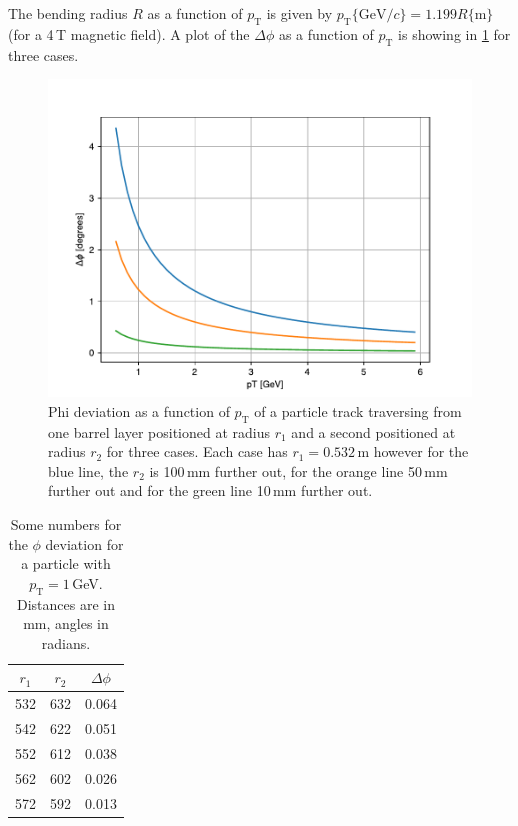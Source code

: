 \documentclass[a4paper, 12pt]{article}
\newcommand{\pt}{\ensuremath{p_{\mathrm{T}}}\xspace}
\begin{document}
The bending radius $R$ as a function of \pt is given by $\pt \{ \mathrm{GeV}/c \} = 1.199 R \{ \mathrm{m} \} $ (for a 4\,T magnetic field).
A plot of the $\Delta \phi$ as a function of \pt is showing in \cref{fig:phiDeviation} for three cases.
\begin{figure}
  \centering
  \includegraphics[width=0.7\linewidth]{images/phiDeviation.pdf}
  \caption{Phi deviation as a function of \pt of a particle track traversing from one barrel layer positioned at radius $r_1$ and a second positioned at radius $r_2$ for three cases. 
  Each case has $r_1 = 0.532$\,m however for the blue line, the $r_2$ is 100\,mm further out, for the orange line 50\,mm further out and for the green line 10\,mm further out.}
  \label{fig:phiDeviation}
\end{figure}

\begin{table}
  \centering
  \begin{tabular}{ccc}
    \toprule
    $r_1$ & $r_2$ & $\Delta \phi$ \\
    \midrule
    532 & 632 & 0.064 \\
    542 & 622 & 0.051 \\
    552 & 612 & 0.038 \\
    562 & 602 & 0.026 \\
    572 & 592 & 0.013 \\
    \bottomrule
  \end{tabular}
  \caption{Some numbers for the $\phi$ deviation for a particle with $\pt = 1$\,GeV.
  Distances are in mm, angles in radians.}
\end{table}
\end{document}
